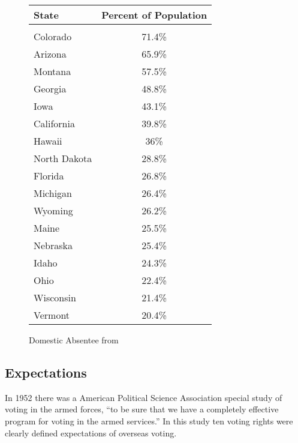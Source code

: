 \begin{figure}
\begin{center}
\begin{tabular}{l c}
State & Percent of Population\\\hline\\
Colorado & 71.4\%\\
Arizona & 65.9\%\\
Montana & 57.5\%\\
Georgia & 48.8\%\\
Iowa & 43.1\%\\
California & 39.8\%\\
Hawaii & 36\%\\
North Dakota & 28.8\%\\
Florida & 26.8\%\\
Michigan & 26.4\%\\
Wyoming & 26.2\%\\
Maine & 25.5\%\\
Nebraska & 25.4\%\\
Idaho & 24.3\%\\
Ohio & 22.4\%\\
Wisconsin & 21.4\%\\
Vermont & 20.4\%\\
\end{tabular}
\end{center}
\caption{Domestic Absentee from }
\label{fig:domestic_populations}
\end{figure}

\subsection{Expectations}

In 1952 there was a American Political Science Association special study of voting in the armed forces, ``to be sure that we have a completely effective program for voting in the armed services.'' In this study ten voting rights were clearly defined expectations of overseas voting.

